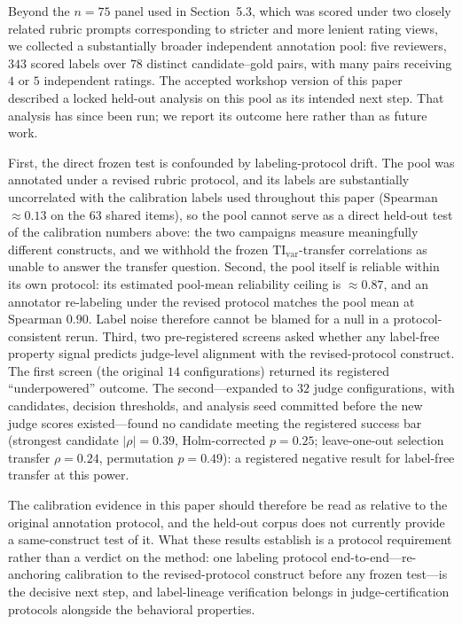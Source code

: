 \documentclass{article}
\begin{document}
Beyond the \(n=75\) panel used in Section~5.3, which was scored under two closely related rubric prompts corresponding to stricter and more lenient rating views, we collected a substantially broader independent annotation pool: five reviewers, \(343\) scored labels over \(78\) distinct candidate--gold pairs, with many pairs receiving \(4\) or \(5\) independent ratings. The accepted workshop version of this paper described a locked held-out analysis on this pool as its intended next step. That analysis has since been run; we report its outcome here rather than as future work.

First, the direct frozen test is confounded by labeling-protocol drift. The pool was annotated under a revised rubric protocol, and its labels are substantially uncorrelated with the calibration labels used throughout this paper (Spearman \(\approx 0.13\) on the \(63\) shared items), so the pool cannot serve as a direct held-out test of the calibration numbers above: the two campaigns measure meaningfully different constructs, and we withhold the frozen \(\mathrm{TI}_{\mathrm{var}}\)-transfer correlations as unable to answer the transfer question. Second, the pool itself is reliable within its own protocol: its estimated pool-mean reliability ceiling is \(\approx 0.87\), and an annotator re-labeling under the revised protocol matches the pool mean at Spearman \(0.90\). Label noise therefore cannot be blamed for a null in a protocol-consistent rerun. Third, two pre-registered screens asked whether any label-free property signal predicts judge-level alignment with the revised-protocol construct. The first screen (the original \(14\) configurations) returned its registered ``underpowered'' outcome. The second---expanded to \(32\) judge configurations, with candidates, decision thresholds, and analysis seed committed before the new judge scores existed---found no candidate meeting the registered success bar (strongest candidate \(|\rho|=0.39\), Holm-corrected \(p=0.25\); leave-one-out selection transfer \(\rho=0.24\), permutation \(p=0.49\)): a registered negative result for label-free transfer at this power.

The calibration evidence in this paper should therefore be read as relative to the original annotation protocol, and the held-out corpus does not currently provide a same-construct test of it. What these results establish is a protocol requirement rather than a verdict on the method: one labeling protocol end-to-end---re-anchoring calibration to the revised-protocol construct before any frozen test---is the decisive next step, and label-lineage verification belongs in judge-certification protocols alongside the behavioral properties.
\end{document}
